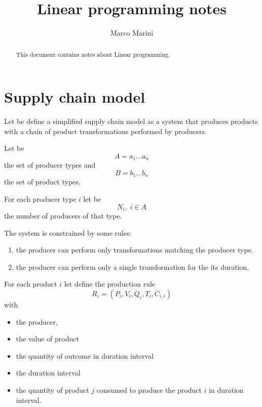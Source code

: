 \documentclass[a4paper,11pt]{article}
\title{Linear programming notes}
\author{Marco Marini}
\begin{document}
\maketitle
\tableofcontents

\begin{abstract}
This document contains notes about Linear programming.
\end{abstract}

\section{Supply chain model}

Let be define a simplified supply chain model as a system
that produces products with a chain of product transformations performed by producers.

Let be
	\[ A = a_1 \dots a_n \]
the set of producer types and
	\[ B = b_1 \dots b_n \]
the set of product types.

For each producer type $ i $ let be
	\[ N_i , \;i \in A\]
the number of producers of that type.

The system is constrained by some rules:
\begin{enumerate}
	\item the producer can perform only transformations
	matching the producer type.
	\item the producer can perform only a single
	transformation for the its duration.
\end{enumerate}

For each product $ i $ let define the production rule
\[ R_i = (P_i, V_i, Q_i, T_i, C_{i,i}) \]
with
\begin{itemize}
	\item the producer,
	\item the value of product
	\item the quantity of outcome in duration interval
	\item the duration interval
	\item the quantity of product $ j $ consumed to produce the product $ i $  in duration interval.
\end{itemize}
\end{document}
